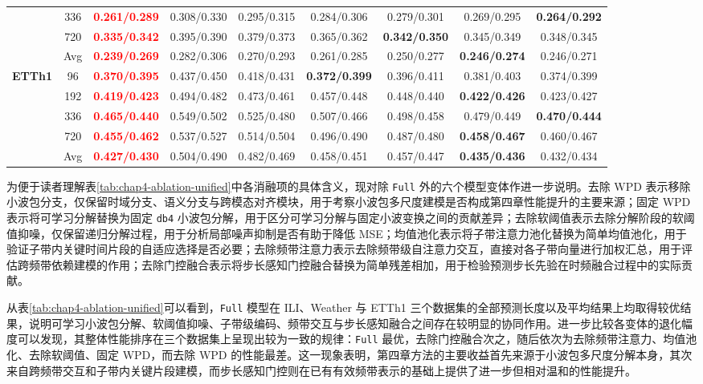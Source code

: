 \begin{table}[!htbp]
{\begin{tabular}{c|c|c|c|c|c|c|c|c}
& 336 & \textbf{\textcolor{red}{0.261/0.289}} & 0.308/0.330 & 0.295/0.315 & 0.284/0.306 & 0.279/0.301 & 0.269/0.295 & \textbf{0.264/0.292} \\
& 720 & \textbf{\textcolor{red}{0.335/0.342}} & 0.395/0.390 & 0.379/0.373 & 0.365/0.362 & \textbf{0.342/0.350} & 0.345/0.349 & 0.348/0.345 \\
& Avg & \textbf{\textcolor{red}{0.239/0.269}} & 0.282/0.306 & 0.270/0.293 & 0.261/0.285 & 0.250/0.277 & \textbf{0.246/0.274} & 0.246/0.271 \\
\midrule
\multirow{5}{*}{\textbf{ETTh1}}
& 96 & \textbf{\textcolor{red}{0.370/0.395}} & 0.437/0.450 & 0.418/0.431 & \textbf{0.372/0.399} & 0.396/0.411 & 0.381/0.403 & 0.374/0.399 \\
& 192 & \textbf{\textcolor{red}{0.419/0.423}} & 0.494/0.482 & 0.473/0.461 & 0.457/0.448 & 0.448/0.440 & \textbf{0.422/0.426} & 0.423/0.427 \\
& 336 & \textbf{\textcolor{red}{0.465/0.440}} & 0.549/0.502 & 0.525/0.480 & 0.507/0.466 & 0.498/0.458 & 0.479/0.449 & \textbf{0.470/0.444} \\
& 720 & \textbf{\textcolor{red}{0.455/0.462}} & 0.537/0.527 & 0.514/0.504 & 0.496/0.490 & 0.487/0.480 & \textbf{0.458/0.467} & 0.460/0.467 \\
& Avg & \textbf{\textcolor{red}{0.427/0.430}} & 0.504/0.490 & 0.482/0.469 & 0.458/0.451 & 0.457/0.447 & \textbf{0.435/0.436} & 0.432/0.434 \\
\bottomrule
\end{tabular}
}
\end{table}

为便于读者理解表\ref{tab:chap4-ablation-unified}中各消融项的具体含义，现对除 \texttt{Full} 外的六个模型变体作进一步说明。去除 WPD 表示移除小波包分支，仅保留时域分支、语义分支与跨模态对齐模块，用于考察小波包多尺度建模是否构成第四章性能提升的主要来源；固定 WPD 表示将可学习分解替换为固定 \texttt{db4} 小波包分解，用于区分可学习分解与固定小波变换之间的贡献差异；去除软阈值表示去除分解阶段的软阈值抑噪，仅保留递归分解过程，用于分析局部噪声抑制是否有助于降低 MSE；均值池化表示将子带注意力池化替换为简单均值池化，用于验证子带内关键时间片段的自适应选择是否必要；去除频带注意力表示去除频带级自注意力交互，直接对各子带向量进行加权汇总，用于评估跨频带依赖建模的作用；去除门控融合表示将步长感知门控融合替换为简单残差相加，用于检验预测步长先验在时频融合过程中的实际贡献。

从表\ref{tab:chap4-ablation-unified}可以看到，\texttt{Full} 模型在 ILI、Weather 与 ETTh1 三个数据集的全部预测长度以及平均结果上均取得较优结果，说明可学习小波包分解、软阈值抑噪、子带级编码、频带交互与步长感知融合之间存在较明显的协同作用。进一步比较各变体的退化幅度可以发现，其整体性能排序在三个数据集上呈现出较为一致的规律：\texttt{Full} 最优，去除门控融合次之，随后依次为去除频带注意力、均值池化、去除软阈值、固定 WPD，而去除 WPD 的性能最差。这一现象表明，第四章方法的主要收益首先来源于小波包多尺度分解本身，其次来自跨频带交互和子带内关键片段建模，而步长感知门控则在已有有效频带表示的基础上提供了进一步但相对温和的性能提升。

